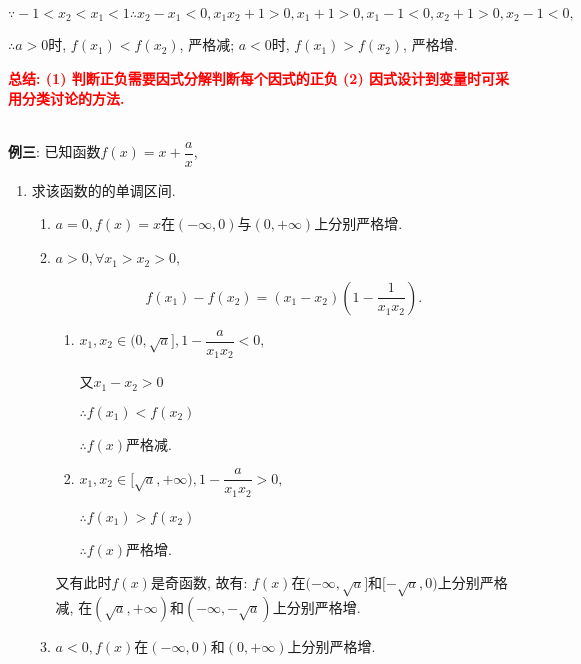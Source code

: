 \documentclass[8pt]{article}
\begin{document}
					$\because -1<x_2<x_1<1 \therefore x_2 - x_1 < 0, x_1 x_2 + 1 > 0, x_1 + 1 > 0, x_1 - 1 < 0, x_2 + 1 > 0, x_2 - 1 < 0,$

					$\therefore a>0$时, $f(x_1) < f(x_2)$, 严格减; $a<0$时, $f(x_1) > f(x_2)$, 严格增.

					\textbf{\textcolor{red}{总结: (1) 判断正负需要因式分解判断每个因式的正负 (2) 因式设计到变量时可采用分类讨论的方法.}}

				~\\

				\textbf{例三}: 已知函数$f(x)=x+\dfrac{a}{x}$,

					\begin{enumerate}[label=(\arabic*)]
						\item 求该函数的的单调区间.
							~\\

							\begin{enumerate}[label=${\arabic*}^{\circ}$]
								\item $a=0, f(x)=x$在$(-\infty, 0)$与$(0, +\infty)$上分别严格增.

								\item $a>0, \forall x_1 > x_2 > 0,$
								
								$$f(x_1) - f(x_2) = (x_1 - x_2) \left(1-\frac{1}{x_1 x_2}\right).$$

									\begin{enumerate}[label=${\arabic*}^{\circ}$]
										\item $x_1, x_2 \in (0, \sqrt{a}], 1-\dfrac{a}{x_1 x_2} < 0,$

											又$x_1 - x_2 > 0$

											$\therefore f(x_1) < f(x_2)$

											$\therefore f(x)$严格减.

										\item $x_1, x_2 \in [\sqrt{a}, +\infty), 1-\dfrac{a}{x_1 x_2} > 0,$

											$\therefore f(x_1) > f(x_2)$

											$\therefore f(x)$严格增.

									\end{enumerate}

									又有此时$f(x)$是奇函数, 故有: $f(x)$在$(-\infty, \sqrt{a}]$和$[-\sqrt{a}, 0)$上分别严格减, 在$(\sqrt{a}, +\infty)$和$(-\infty, -\sqrt{a})$上分别严格增.

								\item $a<0, f(x)$在$(-\infty, 0)$和$(0, +\infty)$上分别严格增.
							\end{enumerate}


\end{enumerate}
\end{document}
